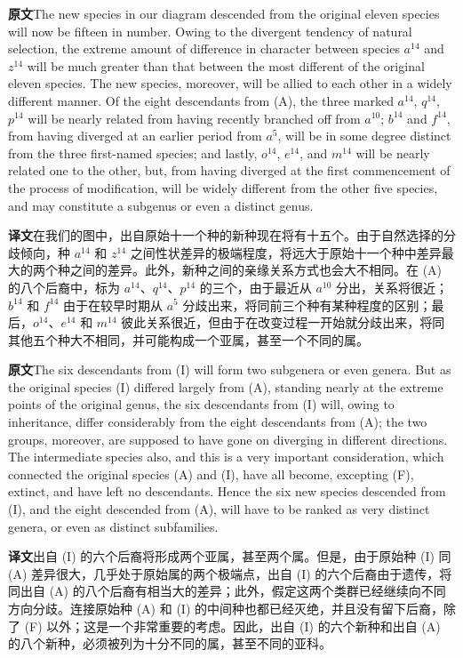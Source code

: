 \documentclass[UTF8,zihao=-4]{ctexart}
\newcommand{\BodyFont}{\fontsize{10.5pt}{15.5pt}\selectfont}
\newcommand{\origlabel}{\textbf{原文}\quad}
\newcommand{\translabel}{\textbf{译文}\quad}
\newenvironment{enblock}{\par\noindent\begingroup\BodyFont\origlabel}{\par\endgroup}
\newenvironment{zhblock}{\par\noindent\begingroup\BodyFont\translabel}{\par\endgroup\vspace{0.35em}}
\newcommand{\pair}[2]{\begin{enblock}#1\end{enblock}\begin{zhblock}#2\end{zhblock}}
\begin{document}
\pair{The new species in our diagram descended from the original eleven species will now be fifteen in number. Owing to the divergent tendency of natural selection, the extreme amount of difference in character between species $a^{14}$ and $z^{14}$ will be much greater than that between the most different of the original eleven species. The new species, moreover, will be allied to each other in a widely different manner. Of the eight descendants from (A), the three marked $a^{14}$, $q^{14}$, $p^{14}$ will be nearly related from having recently branched off from $a^{10}$; $b^{14}$ and $f^{14}$, from having diverged at an earlier period from $a^{5}$, will be in some degree distinct from the three first-named species; and lastly, $o^{14}$, $e^{14}$, and $m^{14}$ will be nearly related one to the other, but, from having diverged at the first commencement of the process of modification, will be widely different from the other five species, and may constitute a subgenus or even a distinct genus.}{在我们的图中，出自原始十一个种的新种现在将有十五个。由于自然选择的分歧倾向，种 $a^{14}$ 和 $z^{14}$ 之间性状差异的极端程度，将远大于原始十一个种中差异最大的两个种之间的差异。此外，新种之间的亲缘关系方式也会大不相同。在 (A) 的八个后裔中，标为 $a^{14}$、$q^{14}$、$p^{14}$ 的三个，由于最近从 $a^{10}$ 分出，关系将很近；$b^{14}$ 和 $f^{14}$ 由于在较早时期从 $a^{5}$ 分歧出来，将同前三个种有某种程度的区别；最后，$o^{14}$、$e^{14}$ 和 $m^{14}$ 彼此关系很近，但由于在改变过程一开始就分歧出来，将同其他五个种大不相同，并可能构成一个亚属，甚至一个不同的属。}

\pair{The six descendants from (I) will form two subgenera or even genera. But as the original species (I) differed largely from (A), standing nearly at the extreme points of the original genus, the six descendants from (I) will, owing to inheritance, differ considerably from the eight descendants from (A); the two groups, moreover, are supposed to have gone on diverging in different directions. The intermediate species also, and this is a very important consideration, which connected the original species (A) and (I), have all become, excepting (F), extinct, and have left no descendants. Hence the six new species descended from (I), and the eight descended from (A), will have to be ranked as very distinct genera, or even as distinct subfamilies.}{出自 (I) 的六个后裔将形成两个亚属，甚至两个属。但是，由于原始种 (I) 同 (A) 差异很大，几乎处于原始属的两个极端点，出自 (I) 的六个后裔由于遗传，将同出自 (A) 的八个后裔有相当大的差异；此外，假定这两个类群已经继续向不同方向分歧。连接原始种 (A) 和 (I) 的中间种也都已经灭绝，并且没有留下后裔，除了 (F) 以外；这是一个非常重要的考虑。因此，出自 (I) 的六个新种和出自 (A) 的八个新种，必须被列为十分不同的属，甚至不同的亚科。}
\end{document}
